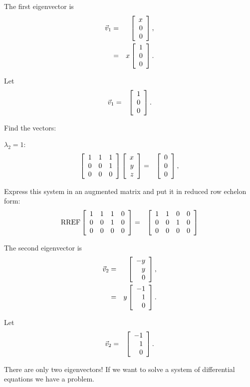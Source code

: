 \begin{frame}
  The first eigenvector is 
  \begin{eqnarray*}
    \vec{v}_1 & = & \left[ \begin{array}{r} x \\ 0 \\ 0 \end{array} \right], \\
    & = & x \left[ \begin{array}{r} 1 \\ 0 \\ 0 \end{array} \right].
  \end{eqnarray*}

  Let
  \begin{eqnarray*}
    \vec{v}_1 & = & \left[ \begin{array}{r} 1 \\ 0 \\ 0 \end{array} \right].
  \end{eqnarray*}

\end{frame}

\begin{frame}
  Find the vectors:

  $\lambda_2 = 1$:
  \begin{eqnarray*}
    \left[ \begin{array}{rrr} 1 & 1 & 1 \\ 0 & 0 & 1 \\ 0 & 0 & 0 \end{array} \right]
    \left[ \begin{array}{r} x \\ y \\ z \end{array} \right] & = & \left[ \begin{array}{r} 0 \\ 0 \\ 0 \end{array} \right], \\
  \end{eqnarray*}

  Express this system in an augmented matrix and put it in reduced row
  echelon form:
  \begin{eqnarray*}
    \mathrm{RREF}\left[ \begin{array}{rrrr}
    1 & 1 & 1 & 0 \\  
    0 & 0 & 1 & 0 \\ 
    0 & 0 & 0 & 0 \\ 
    \end{array} \right]
    & = & 
    \left[ \begin{array}{rrrr}
    1 & 1 & 0 & 0 \\  
    0 & 0 & 1 & 0 \\ 
    0 & 0 & 0 & 0 \\ 
    \end{array} \right]
  \end{eqnarray*}

\end{frame}

\begin{frame}

  The second eigenvector is 
  \begin{eqnarray*}
    \vec{v}_2 & = & \left[ \begin{array}{r} -y \\ y \\ 0 \end{array} \right], \\
    & = & y \left[ \begin{array}{r} -1 \\ 1 \\ 0 \end{array} \right].
  \end{eqnarray*}

  Let
  \begin{eqnarray*}
    \vec{v}_2 & = & \left[ \begin{array}{r} -1 \\ 1 \\ 0 \end{array} \right].
  \end{eqnarray*}

  There are only two eigenvectors! If we want to solve a system of
  differential equations we have a problem.

\end{frame}

